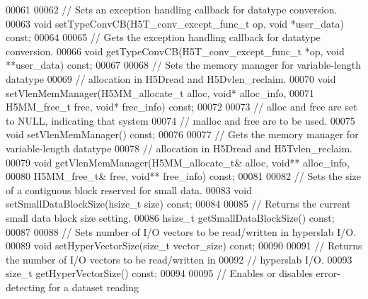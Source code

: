 \begin{DoxyCode}
00061 
00062         \textcolor{comment}{// Sets an exception handling callback for datatype conversion.}
00063         \textcolor{keywordtype}{void} setTypeConvCB(H5T\_conv\_except\_func\_t op, \textcolor{keywordtype}{void} *user\_data) \textcolor{keyword}{const};
00064 
00065         \textcolor{comment}{// Gets the exception handling callback for datatype conversion.}
00066         \textcolor{keywordtype}{void} getTypeConvCB(H5T\_conv\_except\_func\_t *op, \textcolor{keywordtype}{void} **user\_data) \textcolor{keyword}{const};
00067 
00068         \textcolor{comment}{// Sets the memory manager for variable-length datatype}
00069         \textcolor{comment}{// allocation in H5Dread and H5Dvlen\_reclaim.}
00070         \textcolor{keywordtype}{void} setVlenMemManager(H5MM\_allocate\_t alloc, \textcolor{keywordtype}{void}* alloc\_info,
00071                                H5MM\_free\_t free, \textcolor{keywordtype}{void}* free\_info) \textcolor{keyword}{const};
00072 
00073         \textcolor{comment}{// alloc and free are set to NULL, indicating that system}
00074         \textcolor{comment}{// malloc and free are to be used.}
00075         \textcolor{keywordtype}{void} setVlenMemManager() \textcolor{keyword}{const};
00076 
00077         \textcolor{comment}{// Gets the memory manager for variable-length datatype}
00078         \textcolor{comment}{// allocation in H5Dread and H5Tvlen\_reclaim.}
00079         \textcolor{keywordtype}{void} getVlenMemManager(H5MM\_allocate\_t& alloc, \textcolor{keywordtype}{void}** alloc\_info,
00080                                H5MM\_free\_t& free, \textcolor{keywordtype}{void}** free\_info) \textcolor{keyword}{const};
00081 
00082         \textcolor{comment}{// Sets the size of a contiguous block reserved for small data.}
00083         \textcolor{keywordtype}{void} setSmallDataBlockSize(hsize\_t size) \textcolor{keyword}{const};
00084 
00085         \textcolor{comment}{// Returns the current small data block size setting.}
00086         hsize\_t getSmallDataBlockSize() \textcolor{keyword}{const};
00087 
00088         \textcolor{comment}{// Sets number of I/O vectors to be read/written in hyperslab I/O.}
00089         \textcolor{keywordtype}{void} setHyperVectorSize(\textcolor{keywordtype}{size\_t} vector\_size) \textcolor{keyword}{const};
00090 
00091         \textcolor{comment}{// Returns the number of I/O vectors to be read/written in}
00092         \textcolor{comment}{// hyperslab I/O.}
00093         \textcolor{keywordtype}{size\_t} getHyperVectorSize() \textcolor{keyword}{const};
00094 
00095         \textcolor{comment}{// Enables or disables error-detecting for a dataset reading}

\end{DoxyCode}
